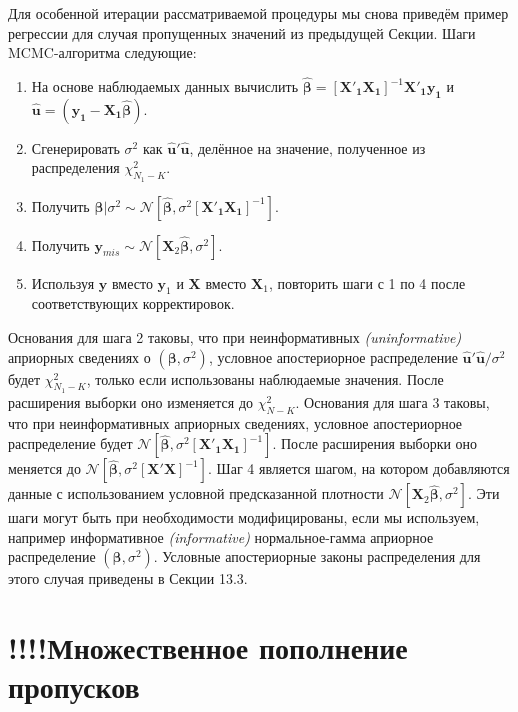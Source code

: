 Для особенной итерации рассматриваемой процедуры мы снова приведём пример регрессии для случая пропущенных значений из предыдущей Секции. Шаги MCMC-алгоритма следующие:
\begin{enumerate}
\item	На основе наблюдаемых данных вычислить $\widehat{\mathbf{\beta}}=[\mathbf{X'_1 X_1}]^{-1}\mathbf{X'_1 y_1}$ и $\widehat{\mathbf{u}}=(\mathbf{y_1-X_1}\widehat{\mathbf{\beta}})$.
\item	Сгенерировать $\sigma^2$ как $\widehat{\mathbf{u}}'\widehat{\mathbf{u}}$, делённое на значение, полученное из распределения $\chi^2_{N_1-K}$.
\item	Получить $\mathbf{\beta}|\sigma^2 \sim \mathcal{N}[\widehat{\mathbf{\beta}}, \sigma^2[\mathbf{X'_1 X_1}]^{-1}]$.
\item	Получить $\mathbf{y}_{mis} \sim \mathcal{N}[\mathbf{X}_2\widehat{\mathbf{\beta}}, \sigma^2]$.
\item	Используя $\mathbf{y}$ вместо $\mathbf{y}_1$ и $\mathbf{X}$ вместо $\mathbf{X}_1$, повторить шаги с 1 по 4 после соответствующих корректировок.
\end{enumerate}

Основания для шага 2 таковы, что при неинформативных \emph{(uninformative)} априорных сведениях о $(\mathbf{\beta}, \sigma^2)$, условное апостериорное распределение $\widehat{\mathbf{u}}'\widehat{\mathbf{u}}/ \sigma^2$ будет $\chi^2_{N_1-K}$, только если использованы наблюдаемые значения. После расширения выборки оно изменяется до $\chi^2_{N-K}$. Основания для шага 3 таковы, что при неинформативных априорных сведениях, условное апостериорное распределение будет $\mathcal{N}[\widehat{\mathbf{\beta}}, \sigma^2[\mathbf{X'_1 X_1}]^{-1}]$. После расширения выборки оно меняется до $\mathcal{N}[\widehat{\mathbf{\beta}}, \sigma^2[\mathbf{X' X}]^{-1}]$. Шаг 4 является шагом, на котором добавляются данные с использованием условной предсказанной плотности $\mathcal{N}[\mathbf{X}_2\widehat{\mathbf{\beta}}, \sigma^2]$. Эти шаги могут быть при необходимости модифицированы, если мы используем, например информативное \emph{(informative)} нормальное-гамма априорное распределение $(\mathbf{\beta}, \sigma^2)$. Условные апостериорные законы распределения для этого случая приведены в Секции 13.3.



\section{!!!!Множественное пополнение пропусков}


